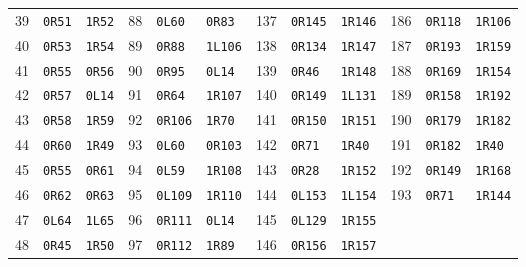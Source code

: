 \begin{center}
\begin{tabular}{@{}rll@{\hspace{12pt}}rll@{\hspace{12pt}}rll@{\hspace{12pt}}rll@{}}
39 & \texttt{0R51} & \texttt{1R52} & 88 & \texttt{0L60} & \texttt{0R83} & 137 & \texttt{0R145} & \texttt{1R146} & 186 & \texttt{0R118} & \texttt{1R106}\\
40 & \texttt{0R53} & \texttt{1R54} & 89 & \texttt{0R88} & \texttt{1L106} & 138 & \texttt{0R134} & \texttt{1R147} & 187 & \texttt{0R193} & \texttt{1R159}\\
41 & \texttt{0R55} & \texttt{0R56} & 90 & \texttt{0R95} & \texttt{0L14} & 139 & \texttt{0R46} & \texttt{1R148} & 188 & \texttt{0R169} & \texttt{1R154}\\
42 & \texttt{0R57} & \texttt{0L14} & 91 & \texttt{0R64} & \texttt{1R107} & 140 & \texttt{0R149} & \texttt{1L131} & 189 & \texttt{0R158} & \texttt{1R192}\\
43 & \texttt{0R58} & \texttt{1R59} & 92 & \texttt{0R106} & \texttt{1R70} & 141 & \texttt{0R150} & \texttt{1R151} & 190 & \texttt{0R179} & \texttt{1R182}\\
44 & \texttt{0R60} & \texttt{1R49} & 93 & \texttt{0L60} & \texttt{0R103} & 142 & \texttt{0R71} & \texttt{1R40} & 191 & \texttt{0R182} & \texttt{1R40}\\
45 & \texttt{0R55} & \texttt{0R61} & 94 & \texttt{0L59} & \texttt{1R108} & 143 & \texttt{0R28} & \texttt{1R152} & 192 & \texttt{0R149} & \texttt{1R168}\\
46 & \texttt{0R62} & \texttt{0R63} & 95 & \texttt{0L109} & \texttt{1R110} & 144 & \texttt{0L153} & \texttt{1L154} & 193 & \texttt{0R71} & \texttt{1R144}\\
47 & \texttt{0L64} & \texttt{1L65} & 96 & \texttt{0R111} & \texttt{0L14} & 145 & \texttt{0L129} & \texttt{1R155} &  &  & \\
48 & \texttt{0R45} & \texttt{1R50} & 97 & \texttt{0R112} & \texttt{1R89} & 146 & \texttt{0R156} & \texttt{1R157} &  &  & \\
\bottomrule\end{tabular}
\end{center}\endgroup
